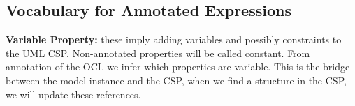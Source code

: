 

\subsection{Vocabulary for Annotated Expressions}
\noindent \textbf{Variable Property:}
these imply adding variables and possibly constraints to the UML CSP.
Non-annotated properties will be called constant.
From annotation of the OCL we infer which properties are variable.
This is the bridge between the model instance and the CSP, when we find a structure in the CSP, we will update these references.

